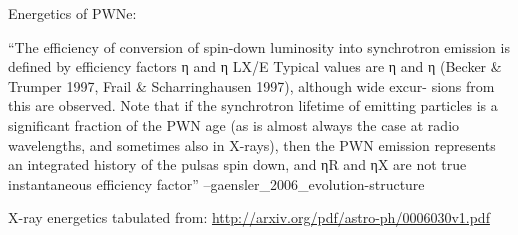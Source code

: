 Energetics of PWNe:

``The efficiency of conversion of spin-down luminosity into synchrotron
emission is defined by efficiency factors η and
η LX/E  Typical values are η
and η (Becker \& Trumper 1997, Frail
\& Scharringhausen 1997), although wide excur- sions from this are
observed. Note that if the synchrotron lifetime of emitting particles is
a significant fraction of the PWN age (as is almost always the case at
radio wavelengths, and sometimes also in X-rays), then the PWN emission
represents an integrated history of the pulsas spin down,
and ηR and ηX are not true instantaneous efficiency factor'' --gaensler\_2006\_evolution-structure

X-ray energetics tabulated from: \url{http://arxiv.org/pdf/astro-ph/0006030v1.pdf}




